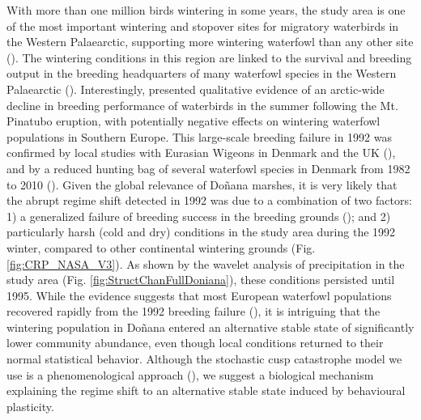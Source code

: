 \documentclass[12pt]{article}
\begin{document}
With more than one million birds wintering in some years, the study area is one of the most important wintering and stopover sites for migratory waterbirds in the Western Palaearctic, supporting more wintering waterfowl than any other site (\cite{Marin2006,Rendon2008,Green2017a,Camacho2022}). The wintering conditions in this region are linked to the survival and breeding output in the breeding headquarters of many waterfowl species in the Western Palaearctic (\cite{Rendon2008,Almaraz2012,Green2017a,Fox2023}). Interestingly, \cite{Ganter2000} presented qualitative evidence of an arctic-wide decline in breeding performance of waterbirds in the summer following the Mt. Pinatubo eruption, with potentially negative effects on wintering waterfowl populations in Southern Europe. This large-scale breeding failure in 1992 was confirmed by local studies with Eurasian Wigeons in Denmark and the UK (\cite{Mitchell2008}), and by a reduced hunting bag of several waterfowl species in Denmark from 1982 to 2010 (\cite{Christensen2014}). Given the global relevance of Doñana marshes, it is very likely that the abrupt regime shift detected in 1992 was due to a combination of two factors: 1) a generalized failure of breeding success in the breeding grounds (\cite{Ganter2000,Mitchell2008,Christensen2014}); and 2) particularly harsh (cold and dry) conditions in the study area during the 1992 winter, compared to other continental wintering grounds (Fig. \ref{fig:CRP_NASA_V3}). As shown by the wavelet analysis of precipitation in the study area (Fig. \ref{fig:StructChanFullDoniana}), these conditions persisted until 1995. While the evidence suggests that most European waterfowl populations recovered rapidly from the 1992 breeding failure (\cite{Ganter2000,Mitchell2008,Christensen2014}), it is intriguing that the wintering population in Doñana entered an alternative stable state of significantly lower community abundance, even though local conditions returned to their normal statistical behavior. Although the stochastic cusp catastrophe model we use is a phenomenological approach (\cite{Casti1979,Poston1979}), we suggest a biological mechanism explaining the regime shift to an alternative stable state induced by behavioural plasticity.\\
\end{document}

